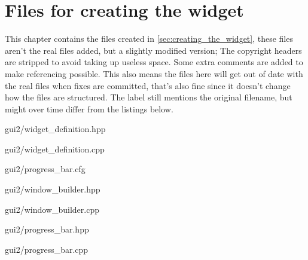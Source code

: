 \chapter{Files for creating the widget}

This chapter contains the files created in \cref{sec:creating_the_widget}, these
files aren't the real files added, but a slightly modified version; The
copyright headers are stripped to avoid taking up useless space. Some extra
comments are added to make referencing possible. This also means the files here
will get out of date with the real files when fixes are committed, that's also
fine since it doesn't change how the files are structured. The label still
mentions the original filename, but might over time differ from the listings
below.


	{gui2/widget_definition.hpp}

\pagebreak

	{gui2/widget_definition.cpp}

\pagebreak

	{gui2/progress_bar.cfg}

\pagebreak

	{gui2/window_builder.hpp}


	{gui2/window_builder.cpp}


	{gui2/progress_bar.hpp}

\pagebreak

	{gui2/progress_bar.cpp}



